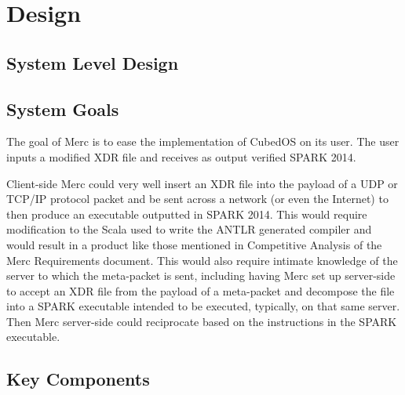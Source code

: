 \chapter{Design}
\label{chapt-design}

\section{System Level Design}

\section{System Goals}

The goal of Merc is to ease the implementation of CubedOS on its user. The user inputs a
modified XDR file and receives as output verified SPARK 2014.

Client-side Merc could very well insert an XDR file into the payload of a UDP or TCP/IP
protocol packet and be sent across a network (or even the Internet) to then produce an
executable outputted in SPARK 2014. This would require modification to the Scala used to write
the ANTLR generated compiler and would result in a product like those mentioned in Competitive
Analysis of the Merc Requirements document. This would also require intimate knowledge of the
server to which the meta-packet is sent, including having Merc set up server-side to accept
an XDR file from the payload of a meta-packet and decompose the file into a SPARK executable
intended to be executed, typically, on that same server. Then Merc server-side could
reciprocate based on the instructions in the SPARK executable.

\section{Key Components}

